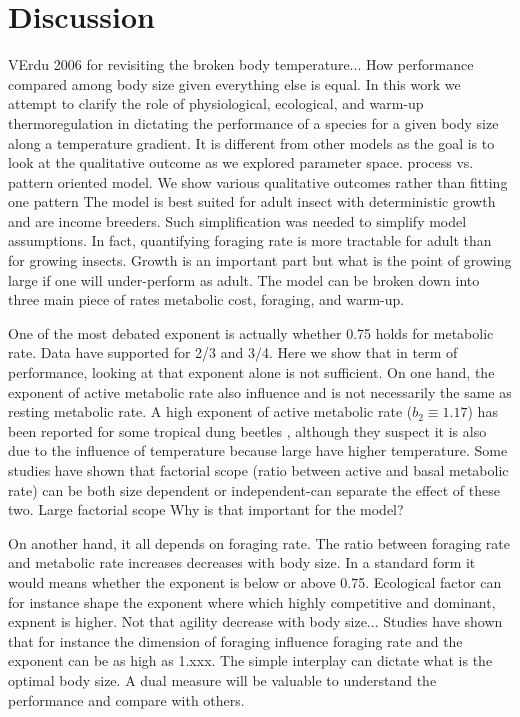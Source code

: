 \section*{Discussion}

VErdu 2006 for revisiting the broken body temperature...
How performance compared among body size given everything else is equal.
In this work we attempt to clarify the role of  physiological, ecological, and warm-up thermoregulation in dictating the performance of a species for a given body size along a temperature gradient.
It is different from other models as the goal is to look at the qualitative outcome as we explored parameter space. process vs. pattern oriented model.
We show various qualitative outcomes rather than fitting one pattern
The model is best suited for adult insect with deterministic growth and are income breeders.  
Such simplification was needed to simplify model assumptions.
In fact, quantifying foraging rate is more tractable for adult than for growing insects.
Growth is an important part but what is the point of growing large if one will under-perform as adult.
The model can be broken down into three main piece of rates  metabolic cost, foraging, and warm-up.

One of the most debated exponent is actually whether 0.75 holds for metabolic rate.
Data have supported for 2/3 and 3/4. 
Here we show that in term of performance, looking at that exponent alone is not sufficient.
On one hand, the exponent of active metabolic rate also influence and is not necessarily the same as resting metabolic rate.
A high exponent of active metabolic rate ($b_2 \equiv 1.17$) has been reported for some tropical dung beetles \citep{Bartholomew1978}, although they suspect it is also due to the influence of temperature because large have higher temperature. 
Some studies have shown that factorial scope (ratio between active and basal metabolic rate) can be both size dependent or independent-can separate the effect of these two.
Large factorial scope
Why is that important for the model?
    
On another hand, it all depends on foraging rate.
The ratio between foraging rate and metabolic rate increases decreases with body size.
In a standard form it would means whether the exponent is below or above 0.75.
Ecological factor can for instance shape the exponent where which highly competitive and dominant, expnent is higher.
Not that agility decrease with body size...
Studies have shown that for instance the dimension of foraging influence foraging rate and the exponent can be as high as 1.xxx.
The simple interplay can dictate what is the optimal body size.
A dual measure will be valuable to understand the performance and compare with others.

